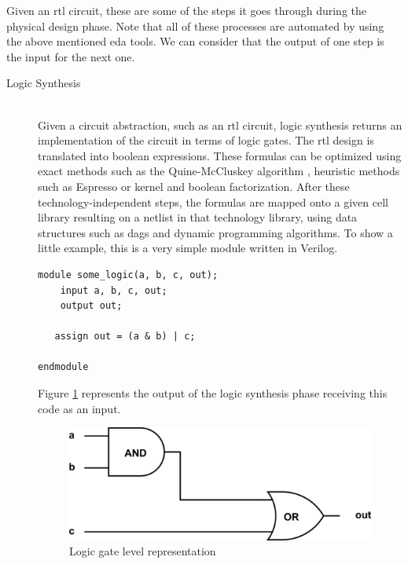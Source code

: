 Given an \gls{rtl} circuit, these are some of the steps it goes through during the physical design phase. Note that all of these processes are automated by using the above mentioned \gls{eda} tools. We can consider that the output of one step is the input for the next one.

\begin{description}
  \item[Logic Synthesis] \hfill \\
  Given a circuit abstraction, such as an \gls{rtl} circuit, logic synthesis returns an implementation of the circuit in terms of logic gates. The \gls{rtl} design is translated into boolean expressions.  These formulas can be optimized using exact methods such as the Quine-McCluskey algorithm \cite{quine, mccluskey}, heuristic methods such as Espresso \cite{espresso} or kernel and boolean factorization. After these technology-independent steps, the formulas are mapped onto a given cell library resulting on a netlist in that technology library, using data structures such as \glspl{dag} and dynamic programming algorithms. To show a little example, this is a very simple module written in Verilog. \\ 
  

\begin{lstlisting}
module some_logic(a, b, c, out);
    input a, b, c, out;
    output out;

   assign out = (a & b) | c;

endmodule 
\end{lstlisting} 

Figure \ref{fig:some_circuit} represents the output of the logic synthesis phase receiving this code as an input. 
  
\begin{figure}[h!]
  \centering
  \includegraphics[scale=0.7]{img/bckgrnd/some_circuit.png}
  \caption{Logic gate level representation}
  \label{fig:some_circuit}
\end{figure}   
  

\end{description}
